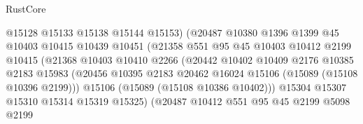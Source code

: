 \begin{lexlean}{RustCore}
\begin{coremodule}
                                    @15128
                                    @15133
                                    @15138
                                    @15144
                                    @15153)
                                  (@20487
                                    @10380
                                    @1396
                                    @1399
                                    @45
                                    @10403
                                    @10415
                                    @10439
                                    @10451
                                    (@21358
                                      @551
                                      @95
                                      @45
                                      @10403
                                      @10412
                                      @2199
                                      @10415
                                      (@21368
                                        @10403
                                        @10410
                                        @2266
                                        (@20442
                                          @10402
                                          @10409
                                          @2176
                                          @10385
                                          @2183
                                          @15983
                                          (@20456
                                            @10395
                                            @2183
                                            @20462
                                            @16024
                                            @15106
                                            (@15089 (@15108 @10396 @2199)))
                                          @15106
                                          (@15089 (@15108 @10386 @10402)))
                                        @15304
                                        @15307
                                        @15310
                                        @15314
                                        @15319
                                        @15325)
                                      (@20487
                                        @10412
                                        @551
                                        @95
                                        @45
                                        @2199
                                        @5098
                                        @2199

\end{coremodule}
\end{lexlean}
